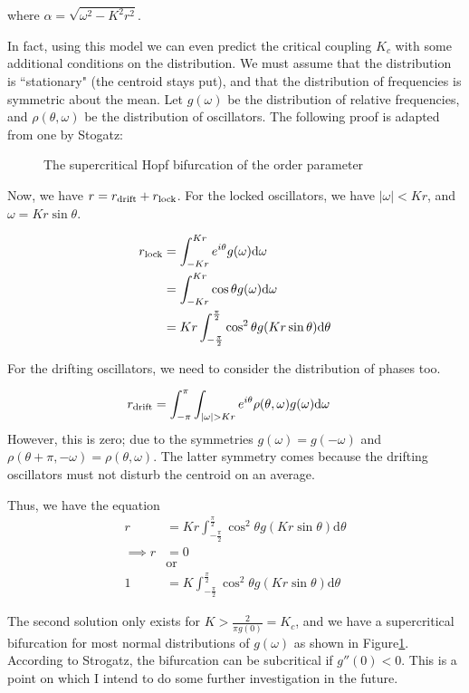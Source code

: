 \documentclass[12pt]{article}
\begin{document}
where $\alpha = \sqrt{\omega ^2-K^2 r^2}$.

In fact, using this model we can even predict the critical coupling $K_c$ with some additional conditions on the distribution. We must assume that the distribution is ``stationary" (the centroid stays put), and that the distribution of frequencies is symmetric about the mean. Let $g(\omega)$ be the distribution of relative frequencies, and $\rho(\theta,\omega)$ be the distribution of oscillators. The following proof is adapted from one by Stogatz\cite{strogatz2000kuramoto}:
\begin{figure}
\centering


\caption{The supercritical Hopf bifurcation of the order parameter}\label{fig:math:bifur}
\end{figure}
Now, we have $r = r_{\rm drift} + r_{\rm lock}$. For the locked oscillators, we have $|\omega|<Kr$, and $\omega=Kr\sin\theta$.

\begin{align*}
r_{\rm lock} &= \int_{-Kr}^{Kr}e^{i\theta}g(\omega)\mathrm d\omega\\
&= \int_{-Kr}^{Kr}\cos\theta g(\omega)\mathrm d\omega\\
&=Kr \int_{-\frac\pi2}^{\frac\pi2}\cos^2\theta g(Kr\sin\theta)\mathrm d\theta
\end{align*}

For the drifting oscillators, we need to consider the distribution of phases too.

\begin{align*}
r_{\rm drift} &= \int_{-\pi}^{\pi}\int_{|\omega|>Kr}e^{i\theta}\rho(\theta,\omega)g(\omega)\mathrm d\omega
\end{align*}
However, this is zero; due to the symmetries $g(\omega)=g(-\omega)$ and $\rho(\theta+\pi,-\omega)=\rho(\theta,\omega)$. The latter symmetry comes because the drifting oscillators must not disturb the centroid on an average.

Thus, we have the equation \begin{align*}
r &=Kr \int_{-\frac\pi2}^{\frac\pi2}\cos^2\theta g(Kr\sin\theta)\mathrm d\theta\\
\implies r &= 0\\
&\text{or} \\
1 &=K \int_{-\frac\pi2}^{\frac\pi2}\cos^2\theta g(Kr\sin\theta)\mathrm d\theta
\end{align*}

The second solution only exists for $K>\frac{2}{\pi g(0)} = K_c$, and we have a supercritical bifurcation for most normal distributions of $g(\omega)$ as shown in Figure\ref{fig:math:bifur}. According to Strogatz\cite{strogatz2000kuramoto}, the bifurcation can be subcritical if $g''(0) < 0$. This is a point on which I intend to do some further investigation in the future.
\end{document}
